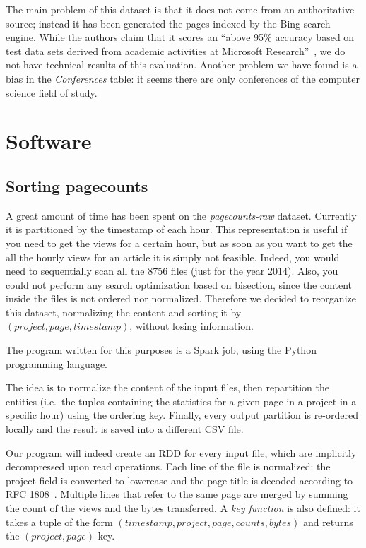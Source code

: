 The main problem of this dataset is that it does not come from an authoritative source; instead it has been generated the pages indexed by the Bing search engine.
While the authors claim that it scores an ``above 95\% accuracy based on test data sets derived from academic activities at Microsoft Research''~\cite{Sinha2015}, we do not have technical results of this evaluation.
Another problem we have found is a bias in the \emph{Conferences} table: it seems there are only conferences of the computer science field of study.


\section{Software}
\label{sec:software}
\subsection{Sorting pagecounts}
\label{sub:Sorting pagecounts}
A great amount of time has been spent on the \emph{pagecounts-raw} dataset.
Currently it is partitioned by the timestamp of each hour.
This representation is useful if you need to get the views for a certain hour, but as soon as you want to get the all the hourly views for an article it is simply not feasible.
Indeed, you would need to sequentially scan all the 8756 files (just for the year 2014).
Also, you could not perform any search optimization based on bisection, since the content inside the files is not ordered nor normalized.
Therefore we decided to reorganize this dataset, normalizing the content and sorting it by $(project, page, timestamp)$, without losing information.

The program written for this purposes is a Spark job, using the Python programming language.

The idea is to normalize the content of the input files, then repartition the entities (i.e.\ the tuples containing the statistics for a given page in a project in a specific hour) using the ordering key.
Finally, every output partition is re-ordered locally and the result is saved into a different CSV file.

Our program will indeed create an \ac{RDD} for every input file, which are implicitly decompressed upon read operations.
Each line of the file is normalized: the project field is converted to lowercase and the page title is decoded according to RFC 1808~\cite{rfc1808}.
Multiple lines that refer to the same page are merged by summing the count of the views and the bytes transferred.
A \emph{key function} is also defined: it takes a tuple of the form $(timestamp, project, page, counts, bytes)$ and returns the $(project, page)$ key.

